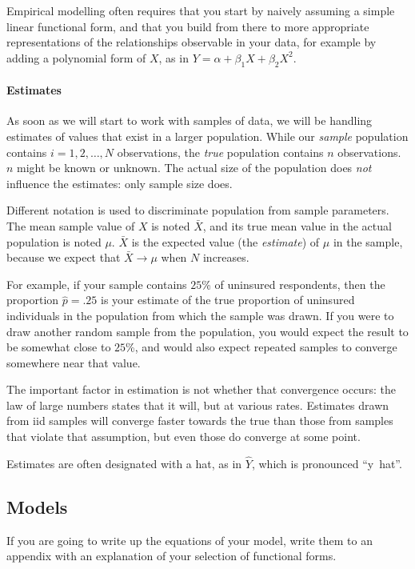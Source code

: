   Empirical modelling often requires that you start by naively assuming a simple linear functional form, and that you build from there to more appropriate representations of the relationships observable in your data, for example by adding a polynomial form of $X$, as in $Y = \alpha + \beta_1 X + \beta_2 X^2 $.%

\paragraph{Estimates}%
  As soon as we will start to work with samples of data, we will be handling estimates of values that exist in a larger population. While our \emph{sample} population contains $i = 1, 2, \ldots, N$ observations, the \emph{true} population contains $n$ observations. $n$ might be known or unknown. The actual size of the population does \emph{not} influence the estimates: only sample size does.%

  Different notation is used to discriminate population from sample parameters. The mean sample value of $X$ is noted $\bar{X}$, and its true mean value in the actual population is noted $\mu$. $\bar{X}$ is the expected value (the \emph{estimate}) of $\mu$ in the sample, because we expect that $\bar X \to \mu$ when $N$ increases.%
    
  For example, if your sample contains $25$\% of uninsured respondents, then the proportion $\hat{p} = .25$ is your estimate of the true proportion of uninsured individuals in the population from which the sample was drawn. If you were to draw another random sample from the population, you would expect the result to be somewhat close to $25$\%, and would also expect repeated samples to converge somewhere near that value.%
  
  The important factor in estimation is not whether that convergence occurs: the law of large numbers states that it will, but at various rates. Estimates drawn from iid samples will converge faster towards the true than those from samples that violate that assumption, but even those do converge at some point.%

  Estimates are often designated with a hat, as in $\hat{Y}$, which is pronounced ``y~hat''. %

\subsection{Models}

If you are going to write up the equations of your model, write them to an appendix with an explanation of your selection of functional forms.

